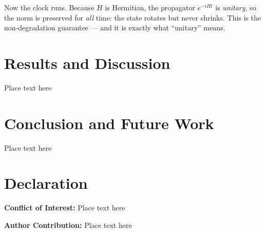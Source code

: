 \documentclass[twoside,10pt]{article}
\begin{document}
Now the clock runs. Because $H$ is Hermitian, the propagator $e^{-iHt}$ is
\emph{unitary}, so the norm is preserved for \emph{all} time: the state rotates but
never shrinks. This is the non-degradation guarantee --- and it is exactly what
``unitary'' means.
\section{Results and Discussion}

Place text here

\section{Conclusion and Future Work}

Place text here

\section{Declaration}
\fontsize{11}{13}\selectfont

\textbf{Conflict of Interest: } Place text here

\textbf{Author Contribution:} Place text here


\printbibliography%
\end{document}

